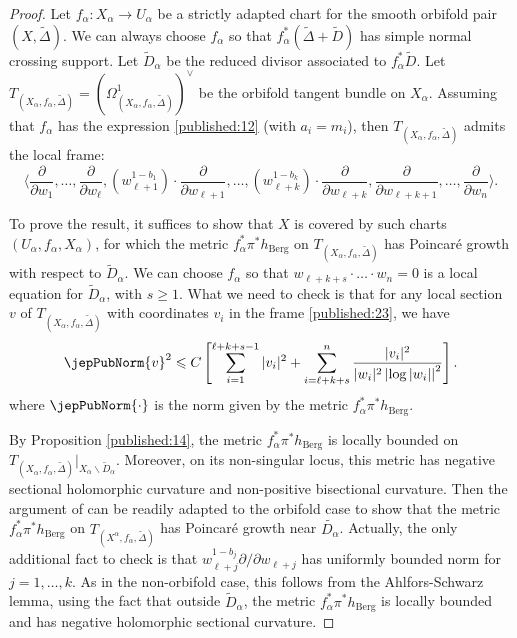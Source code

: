 \begin{proof} 
Let $f_\alpha : X_\alpha \longrightarrow U_\alpha$ be a strictly adapted chart for the smooth orbifold pair $(X, \widetilde{\Delta})$. We can always choose $f_\alpha$ so that $f_\alpha^\ast (\widetilde{\Delta} + \widetilde{D})$ has simple normal crossing support. Let $\widetilde{D}_\alpha$ be the reduced divisor associated to $f^\ast_\alpha \widetilde{D}$. Let $T_{(X_\alpha, f_\alpha, \widetilde{\Delta})} = \left( \Omega^1_{(X_\alpha, f_\alpha, \widetilde{\Delta})} \right)^{\vee}$ 
be the orbifold tangent bundle on $X_\alpha$. Assuming that $f_\alpha$ has the expression \eqref{published:12} (with $a_i = m_i$), then $T_{(X_\alpha, f_\alpha, \widetilde{\Delta})}$ admits the local frame:
\begin{equation} \label{published:23}
\langle    \frac{\partial}{\partial w_1}  , \ldots, \frac{\partial}{\partial w_\ell},  (w^{1 - b_1}_{\ell+1})\cdot \frac{\partial}{\partial w_{\ell+1}}, \ldots, (w^{1 - b_k}_{\ell+k})\cdot \frac{\partial}{\partial w_{\ell+k}}, 
\frac{\partial}{\partial w_{\ell+k+1}}, \ldots, \frac{\partial}{\partial w_n} \rangle. 
\end{equation}

To prove the result, it suffices to show that $X$ is covered by such charts $(U_\alpha, f_\alpha, X_\alpha)$, for which the metric $f_\alpha^\ast \pi^\ast h_{\mathrm{Berg}}$ on $T_{(X_\alpha, f_\alpha, \widetilde{\Delta})}$ has Poincaré growth with respect to $\widetilde{D}_\alpha$. We can choose $f_\alpha$ so that $w_{\ell+k+s} \cdot \ldots \cdot w_{n} = 0$ is a local equation for $\widetilde{D}_\alpha$, with $s \geqslant 1$. What we need to check is that for any local section $v$ of $T_{(X_\alpha, f_\alpha, \widetilde{\Delta})}$ with coordinates $v_i$ in the frame \eqref{published:23}, we have 
$$
\jepPubNorm{v}^2 \leqslant C \left[ \sum_{i =1}^{\ell+ k + s - 1} |v_i|^2 + \sum_{i=\ell+k+s}^{n}  \frac{|v_i|^2}{|w_i|^2 \left| \log |w_i| \right|^2} \right].
$$
where $\jepPubNorm{\cdot}$ is the norm given by the metric $f_\alpha^\ast \pi^\ast h_{\mathrm{Berg}}$.

By Proposition \ref{published:14}, the metric $f^\ast_\alpha \pi^\ast h_{\mathrm{Berg}}$ is locally bounded on $T_{(X_\alpha, f_\alpha, \widetilde{\Delta})}|_{X_\alpha \smallsetminus \widetilde{D}_\alpha}$. Moreover, on its non-singular locus, this metric has negative sectional holomorphic curvature and non-positive bisectional curvature. Then the argument of \cite[Prop.\,2.4]{pubref02} can be readily adapted to the orbifold case to show that the metric $f^\ast_\alpha \pi^\ast h_{\mathrm{Berg}}$ on $T_{(X^\alpha, f_\alpha, \widetilde{\Delta})}$ has Poincaré growth near $\widetilde{D_\alpha}$. Actually, the only additional fact to check is that $w_{\ell+j}^{1 - b_{j}}\partial/\partial w_{\ell+j}$ has uniformly bounded norm for $j = 1, \ldots, k$. As in the non-orbifold case, this follows from the Ahlfors-Schwarz lemma, using the fact that outside $\widetilde{D}_\alpha$, the metric $f_\alpha^\ast \pi^\ast  h_\mathrm{Berg}$ is locally bounded and has negative holomorphic sectional curvature.
\end{proof}

